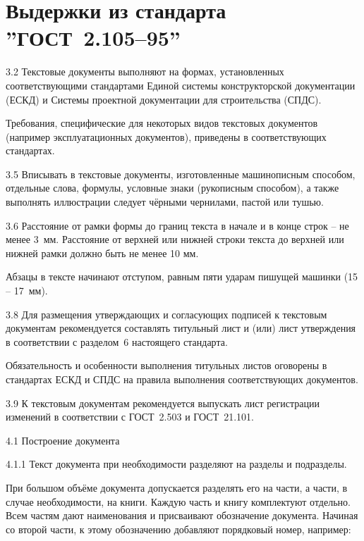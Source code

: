 \section{Выдержки из стандарта ''ГОСТ~2.105–95''}



3.2 Текстовые документы выполняют на формах, установленных соответствующими стандартами Единой системы конструкторской документации (ЕСКД) и Системы проектной документации для строительства (СПДС).

Требования, специфические для некоторых видов текстовых документов (например эксплуатационных документов), приведены в соответствующих стандартах.

3.5 Вписывать в текстовые документы, изготовленные машинописным способом, отдельные слова,
формулы, условные знаки (рукописным способом), а также выполнять иллюстрации следует чёрными
чернилами, пастой или тушью.

3.6 Расстояние от рамки формы до границ текста в начале и в конце строк – не менее 3~мм.
Расстояние от верхней или нижней строки текста до верхней или нижней рамки должно быть не менее 10 мм.

Абзацы в тексте начинают отступом, равным пяти ударам пишущей машинки (15 – 17~мм).

3.8 Для размещения утверждающих и согласующих подписей к текстовым документам рекомендуется
составлять титульный лист и (или) лист утверждения в соответствии с разделом~6 настоящего стандарта.

Обязательность и особенности выполнения титульных листов оговорены в стандартах ЕСКД и СПДС на правила выполнения соответствующих документов.

3.9 К текстовым документам рекомендуется выпускать лист регистрации изменений в соответствии с ГОСТ~2.503 и ГОСТ~21.101.


4.1 Построение документа

4.1.1 Текст документа при необходимости разделяют на разделы и подразделы.

При большом объёме документа допускается разделять его на части, а части, в случае необходимости, на книги. Каждую часть и книгу комплектуют отдельно. Всем частям дают наименования и присваивают обозначение документа. Начиная со второй части, к этому обозначению добавляют порядковый номер,
например:

